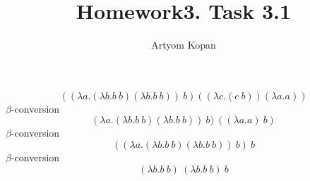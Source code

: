 \documentclass{article}
\title{Homework3. Task 3.1}
\author{Artyom Kopan}
\begin{document}
\huge
\maketitle

\begin{equation}
    ((\lambda a.(\lambda b.b\:b)(\lambda b.b\:b))\:b)((\lambda c.(c\:b))(\lambda a.a))
\end{equation}
$\beta$-conversion
\begin{equation}
    (\lambda a.(\lambda b.b\:b)(\lambda b.b\:b))\:b)\:((\lambda a.a)\:b)
\end{equation}
$\beta$-conversion
\begin{equation}
    ((\lambda a.(\lambda b.b\:b)(\lambda b.b\:b))\:b)\:b
\end{equation}
$\beta$-conversion
\begin{equation}
    (\lambda b.b\:b)\:(\lambda b.b\:b)\:b
\end{equation}
\end{document}
